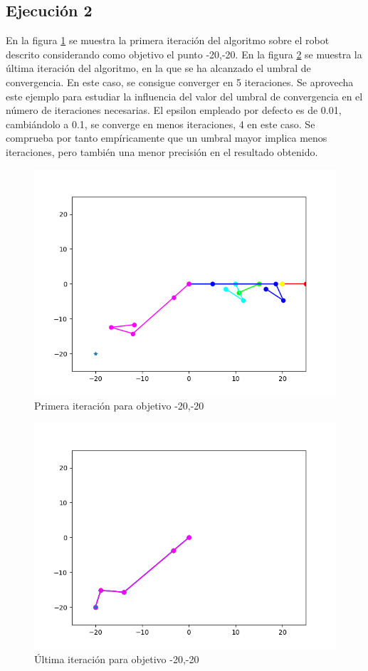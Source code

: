 \subsection{Ejecución 2}
En la figura \ref{chapter:ccd_ejemplo3} se muestra la primera iteración del algoritmo sobre el robot descrito considerando como objetivo el punto -20,-20.
En la figura \ref{chapter:ccd_ejemplo4} se muestra la última iteración del algoritmo, en la que se ha alcanzado el umbral de convergencia. En este caso, se consigue converger en 5 iteraciones.
Se aprovecha este ejemplo para estudiar la influencia del valor del umbral de convergencia en el número de iteraciones necesarias. El epsilon empleado por defecto es de 0.01, cambiándolo a 0.1, se converge en menos iteraciones, 4 en este caso. 
Se comprueba por tanto empíricamente que un umbral mayor implica menos iteraciones, pero también una menor precisión en el resultado obtenido.
\begin{figure}[htb]
   \centering
   \includegraphics[width=.8\linewidth]{images/ccd_7.png}
   \caption{Primera iteración para objetivo -20,-20}
   \label{chapter:ccd_ejemplo3}
\end{figure}
\begin{figure}[htb]
   \centering
   \includegraphics[width=.8\linewidth]{images/ccd_9.png}
   \caption{Última iteración para objetivo -20,-20}
   \label{chapter:ccd_ejemplo4}
\end{figure}


